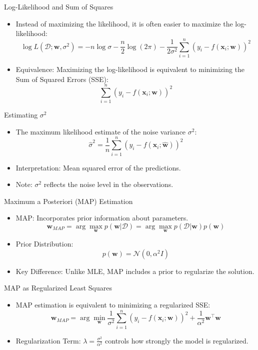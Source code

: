 \documentclass[serif, aspectratio=169]{beamer}
\begin{document}
\begin{frame}{Log-Likelihood and Sum of Squares}
    \begin{itemize}
        \item Instead of maximizing the likelihood, it is often easier to maximize the log-likelihood:
        \[
        \log L(\mathcal{D}; \mathbf{w}, \sigma^2) = -n \log \sigma - \frac{n}{2} \log(2\pi) - \frac{1}{2\sigma^2} \sum_{i=1}^n (y_i - f(\mathbf{x}_i; \mathbf{w}))^2
        \]
        \item Equivalence: Maximizing the log-likelihood is equivalent to minimizing the Sum of Squared Errors (SSE):
        \[
        \sum_{i=1}^n (y_i - f(\mathbf{x}_i; \mathbf{w}))^2
        \]
    \end{itemize}
\end{frame}

\begin{frame}{Estimating \( \sigma^2 \)}
    \begin{itemize}
        \item The maximum likelihood estimate of the noise variance \( \sigma^2 \):
        \[
        \hat{\sigma}^2 = \frac{1}{n} \sum_{i=1}^n \left( y_i - f(\mathbf{x}_i; \hat{\mathbf{w}}) \right)^2
        \]
        \item Interpretation: Mean squared error of the predictions.
        \item Note: \( \sigma^2 \) reflects the noise level in the observations.
    \end{itemize}
\end{frame}

\begin{frame}{Maximum a Posteriori (MAP) Estimation}
    \begin{itemize}
        \item MAP: Incorporates prior information about parameters.
        \[
        \mathbf{w}_{MAP} = \arg \max_{\mathbf{w}} p(\mathbf{w} | \mathcal{D}) = \arg \max_{\mathbf{w}} p(\mathcal{D} | \mathbf{w}) p(\mathbf{w})
        \]
        \item Prior Distribution:
        \[
        p(\mathbf{w}) = \mathcal{N}(0, \alpha^2 I)
        \]
        \item Key Difference: Unlike MLE, MAP includes a prior to regularize the solution.
    \end{itemize}
\end{frame}

\begin{frame}{MAP as Regularized Least Squares}
    \begin{itemize}
        \item MAP estimation is equivalent to minimizing a regularized SSE:
        \[
        \mathbf{w}_{MAP} = \arg \min_{\mathbf{w}} \frac{1}{\sigma^2} \sum_{i=1}^n (y_i - f(\mathbf{x}_i; \mathbf{w}))^2 + \frac{1}{\alpha^2} \mathbf{w}^\top \mathbf{w}
        \]
        \item Regularization Term: \( \lambda = \frac{\sigma^2}{\alpha^2} \) controls how strongly the model is regularized.
    \end{itemize}
\end{frame}
\end{document}
